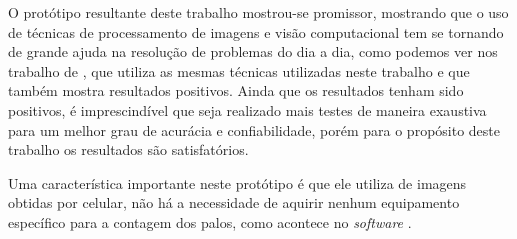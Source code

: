 O protótipo resultante deste trabalho  mostrou-se promissor, mostrando que o uso de técnicas de processamento de imagens e visão computacional tem se tornando de grande ajuda na resolução de problemas do dia a dia, como podemos ver nos trabalho de \cite{SILVA2012},  que utiliza as mesmas técnicas utilizadas neste trabalho e que também mostra resultados positivos. Ainda que os resultados tenham sido positivos,  é imprescindível que seja realizado mais testes de maneira exaustiva para um melhor grau de acurácia e confiabilidade, porém para o propósito deste trabalho os resultados são satisfatórios.

Uma característica importante neste protótipo é que ele utiliza de imagens obtidas por celular, não há a necessidade de aquirir nenhum equipamento específico para a contagem dos palos, como acontece no \textit{software} \cite{skip2018}.







